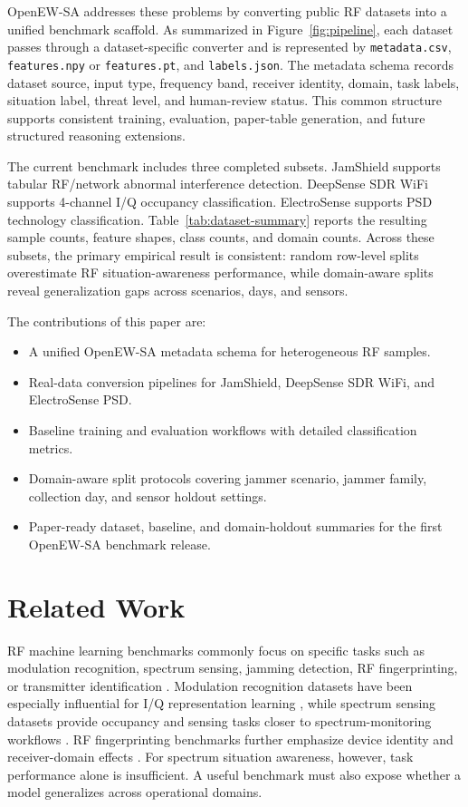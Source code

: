 \documentclass{ieeeaccess}
\newcommand{\artifact}[1]{\texttt{#1}}
\begin{document}
OpenEW-SA addresses these problems by converting public RF datasets into a unified benchmark scaffold. As summarized in Figure~\ref{fig:pipeline}, each dataset passes through a dataset-specific converter and is represented by \artifact{metadata.csv}, \artifact{features.npy} or \artifact{features.pt}, and \artifact{labels.json}. The metadata schema records dataset source, input type, frequency band, receiver identity, domain, task labels, situation label, threat level, and human-review status. This common structure supports consistent training, evaluation, paper-table generation, and future structured reasoning extensions.

The current benchmark includes three completed subsets. JamShield supports tabular RF/network abnormal interference detection. DeepSense SDR WiFi supports 4-channel I/Q occupancy classification. ElectroSense supports PSD technology classification. Table~\ref{tab:dataset-summary} reports the resulting sample counts, feature shapes, class counts, and domain counts. Across these subsets, the primary empirical result is consistent: random row-level splits overestimate RF situation-awareness performance, while domain-aware splits reveal generalization gaps across scenarios, days, and sensors.

The contributions of this paper are:
\begin{itemize}
  \item A unified OpenEW-SA metadata schema for heterogeneous RF samples.
  \item Real-data conversion pipelines for JamShield, DeepSense SDR WiFi, and ElectroSense PSD.
  \item Baseline training and evaluation workflows with detailed classification metrics.
  \item Domain-aware split protocols covering jammer scenario, jammer family, collection day, and sensor holdout settings.
  \item Paper-ready dataset, baseline, and domain-holdout summaries for the first OpenEW-SA benchmark release.
\end{itemize}

\section{Related Work}

RF machine learning benchmarks commonly focus on specific tasks such as modulation recognition, spectrum sensing, jamming detection, RF fingerprinting, or transmitter identification \cite{hall2019referenceRfDatasets,boegner2022largeScaleRfClassification}. Modulation recognition datasets have been especially influential for I/Q representation learning \cite{oshea2016convolutionalRadioModulation,deepsig2016radioml2016a}, while spectrum sensing datasets provide occupancy and sensing tasks closer to spectrum-monitoring workflows \cite{uvaydov2021deepsense,rajendran2017electrosenseOpenBig}. RF fingerprinting benchmarks further emphasize device identity and receiver-domain effects \cite{hanna2022wisig,coreslab2022wisigDataset}. For spectrum situation awareness, however, task performance alone is insufficient. A useful benchmark must also expose whether a model generalizes across operational domains.
\end{document}
